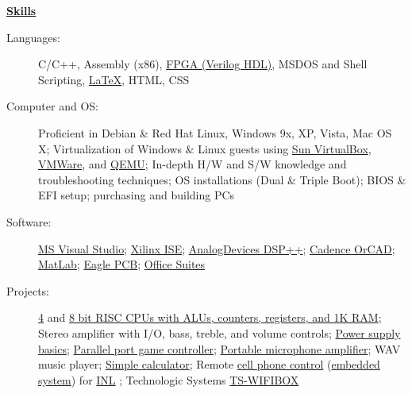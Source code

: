 \documentclass[letterpaper,11pt]{article}
\newcommand{\resheading}[1]{{\large \colorbox{mygrey}{\begin{minipage}{\textwidth}{\textbf{#1 \vphantom{p\^{E}}}}\end{minipage}}}}
\begin{document}
\resheading{\href{http://www.derekhildreth.com/portfolio.php}{Skills}}
	\begin{description}
		\item[Languages:] { \footnotesize C/C++, Assembly (x86), \href{http://www.latticesemi.com/products/designsoftware/isplever/ispleverstarter/index.cfm}{FPGA (Verilog HDL)}, MSDOS and Shell Scripting, \href{http://www.latex-project.org/}{\LaTeX}}, HTML, CSS
		\item[Computer and OS:] { \footnotesize Proficient in Debian \& Red Hat Linux, Windows 9x, XP, Vista, Mac OS X; Virtualization of Windows \& Linux guests using \href{http://www.virtualbox.org}{Sun VirtualBox}, \href{http://www.vmware.com}{VMWare}, and \href{http://www.qemu.com}{QEMU}; In-depth H/W and S/W knowledge and troubleshooting techniques;  OS installations (Dual \& Triple Boot);  BIOS \& EFI setup; purchasing and building PCs }
		\item[Software:]{\footnotesize \href{http://msdn.microsoft.com/en-us/library/ms950416.aspx}{MS Visual Studio}; \href{http://www.xilinx.com/tools/designtools.htm}{Xilinx ISE}; \href{http://www.analog.com}{AnalogDevices DSP++}; \href{http://www.cadence.com/products/orcad/Pages/default_test.aspx}{Cadence OrCAD}; \href{http://www.matlab.com}{MatLab}; \href{http://www.cadsoft.de/}{Eagle PCB}; \href{http://www.openoffice.org/}{Office Suites}}  
		\item[Projects:] { \footnotesize 
\href{http://www.derekhildreth.com/portfolio/Computer_Engineering/4-Bit_CPU_Fundamental_Digital_Systems_CompE224.zip}{4} 
and 
\href{http://www.derekhildreth.com/portfolio/Computer_Engineering/8-Bit_CPU_Comp_Architecture_CompE324.pdf}{8 bit RISC CPUs with ALUs, counters, registers, and 1K RAM}; 
Stereo amplifier with I/O, bass, treble, and volume controls; 
\href{http://www.derekhildreth.com/portfolio/Computer_Engineering/Zener_Diode_Power_Supply_Basics_Electrics_Devices_and_Circtuits_CompE350.pdf}{Power supply basics}; 
\href{http://www.derekhildreth.com/portfolio/Computer_Engineering/BZFlag_Game_Controller_Computer_IO_CompE360.pdf}{Parallel port game controller}; 
\href{http://www.derekhildreth.com/portfolio/Computer_Engineering/Microphone_Preamplifier_Electrics_Devices_and_Circuits_CompE350.pdf}{Portable microphone amplifier}; 
WAV music player; 
\href{http://www.derekhildreth.com/portfolio/Computer_Engineering/Simple_Calculator_Verilog_Digital_Systems_Design_CompE340.pdf}{Simple calculator}; 
Remote \href{http://emp.byui.edu/smithk/compe499_s09/teamwork/default.htm}{cell phone control} (\href{http://www.embeddedarm.com/products/board-detail.php?product=TS-7350}{embedded system}) for \href{http://www.inl.gov}{INL} ; Technologic Systems \href{http://www.embeddedarm.com/products/board-detail.php?product=TS-WIFIBOX}{TS-WIFIBOX}}
	\end{description} %
\end{document}
